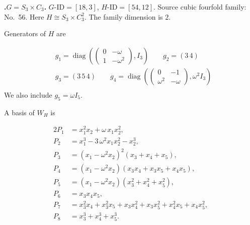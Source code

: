 \documentclass[12pt]{amsart}
\numberwithin{equation}{section}
\theoremstyle{plain}
\theoremstyle{definition}
\theoremstyle{remark}
\DeclareMathOperator{\diag}{diag}
\newenvironment{familydisplay}{%
  \begingroup
  \setlength{\arraycolsep}{1.35pt}%
  \renewcommand{\arraystretch}{0.96}%
  \setlength{\jot}{2pt}%
}{\endgroup}
\newcommand{\smat}[1]{\left(\begin{smallmatrix}#1\end{smallmatrix}\right)}
\begin{document}
\par{}\medskip\noindent\textbf{.\enspace $G=S_3\times C_3$.}\label{fam:threefold-no-11}
$G\text{-ID}=[18,3]$, $H\text{-ID}=[54,12]$.
Source cubic fourfold family: No.~56.  Here
$H\cong S_3\times C_3^2$.
The family dimension is $2$.
\par\smallskip\noindent Generators of $H$ are\par\nopagebreak
\begin{familydisplay}
\begin{align*}
&g_{1}=\diag\!\left(\smat{0&-\omega\\1&-\omega^2},I_3\right)
\qquad g_{2}=(3\,4)\\
&g_{3}=(3\,5\,4)\qquad
g_{4}=\diag\!\left(\smat{0&-1\\\omega^2&-\omega},\omega^2I_3\right)\\
\end{align*}
\end{familydisplay}
\noindent We also include $g_{5}=\omega I_5$.
\par\smallskip\noindent A basis of $W_H$ is\par\nopagebreak
\begin{familydisplay}
\begin{alignat*}{2}
P_{1}&=x_{1}^{2}x_{2}+\omega\,x_{1}x_{2}^{2},\\[2pt]
P_{2}&=x_{1}^{3}-3\,\omega^2x_{1}x_{2}^{2}-x_{2}^{3},\\[2pt]
P_{3}&=(x_{1}-\omega^2x_{2})^2(x_{3}+x_{4}+x_{5}),\\[2pt]
P_{4}&=(x_{1}-\omega^2x_{2})(x_{3}x_{4}+x_{3}x_{5}+x_{4}x_{5}),\\[2pt]
P_{5}&=(x_{1}-\omega^2x_{2})(x_{3}^{2}+x_{4}^{2}+x_{5}^{2}),\\[2pt]
P_{6}&=x_{3}x_{4}x_{5},\\[2pt]
P_{7}&=x_{3}^{2}x_{4}+x_{3}^{2}x_{5}+x_{3}x_{4}^{2}+x_{3}x_{5}^{2}+x_{4}^{2}x_{5}+x_{4}x_{5}^{2},\\[2pt]
P_{8}&=x_{3}^{3}+x_{4}^{3}+x_{5}^{3}.\\[2pt]
\end{alignat*}
\end{familydisplay}
\end{document}
